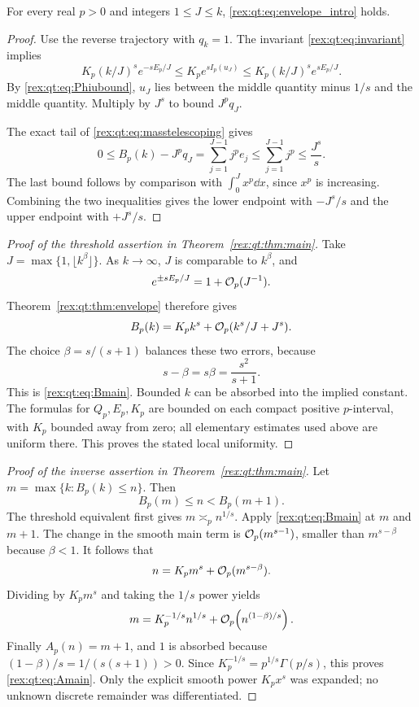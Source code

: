 \begin{theorem}\label{rex:qt:thm:envelope}
For every real $p>0$ and integers $1\le J\le k$, \eqref{rex:qt:eq:envelope_intro} holds.
\end{theorem}
\begin{proof}
Use the reverse trajectory with $q_k=1$. The invariant \eqref{rex:qt:eq:invariant} implies
\[
 K_p(k/J)^s e^{-sE_p/J}
 \le K_p e^{sI_p(u_J)}
 \le K_p(k/J)^s e^{sE_p/J}.
\]
By \eqref{rex:qt:eq:Phiubound}, $u_J$ lies between the middle quantity minus $1/s$ and the middle quantity. Multiply by $J^s$ to bound $J^p q_J$.

The exact tail of \eqref{rex:qt:eq:masstelescoping} gives
\begin{equation}\label{rex:qt:eq:tail}
 0\le B_p(k)-J^p q_J
     =\sum_{j=1}^{J-1}j^p e_j
     \le\sum_{j=1}^{J-1}j^p\le\frac{J^s}{s}.
\end{equation}
The last bound follows by comparison with $\int_0^J x^p\dd x$, since $x^p$ is increasing. Combining the two inequalities gives the lower endpoint with $-J^s/s$ and the upper endpoint with $+J^s/s$.
\end{proof}

\begin{proof}[Proof of the threshold assertion in Theorem~\ref{rex:qt:thm:main}]
Take $J=\max\{1,\lfloor k^\beta\rfloor\}$. As $k\to\infty$, $J$ is comparable to $k^\beta$, and
\[
 e^{\pm sE_p/J}=1+\mathcal O_p(J^{-1}).
\]
Theorem~\ref{rex:qt:thm:envelope} therefore gives
\[
 B_p(k)=K_p k^s+\mathcal O_p(k^s/J+J^s).
\]
The choice $\beta=s/(s+1)$ balances these two errors, because
\[
 s-\beta=s\beta=\frac{s^2}{s+1}.
\]
This is \eqref{rex:qt:eq:Bmain}. Bounded $k$ can be absorbed into the implied constant. The formulas for $Q_p,E_p,K_p$ are bounded on each compact positive $p$-interval, with $K_p$ bounded away from zero; all elementary estimates used above are uniform there. This proves the stated local uniformity.
\end{proof}

\begin{proof}[Proof of the inverse assertion in Theorem~\ref{rex:qt:thm:main}]
Let $m=\max\{k:B_p(k)\le n\}$. Then
\[
 B_p(m)\le n<B_p(m+1).
\]
The threshold equivalent first gives $m\asymp_p n^{1/s}$. Apply \eqref{rex:qt:eq:Bmain} at $m$ and $m+1$. The change in the smooth main term is $\mathcal O_p(m^{s-1})$, smaller than $m^{s-\beta}$ because $\beta<1$. It follows that
\[
 n=K_p m^s+\mathcal O_p(m^{s-\beta}).
\]
Dividing by $K_p m^s$ and taking the $1/s$ power yields
\[
 m=K_p^{-1/s}n^{1/s}+\mathcal O_p\!\left(n^{(1-\beta)/s}\right).
\]
Finally $A_p(n)=m+1$, and $1$ is absorbed because $(1-\beta)/s=1/(s(s+1))>0$. Since $K_p^{-1/s}=p^{1/s}\Gamma(p/s)$, this proves \eqref{rex:qt:eq:Amain}. Only the explicit smooth power $K_p x^s$ was expanded; no unknown discrete remainder was differentiated.
\end{proof}

